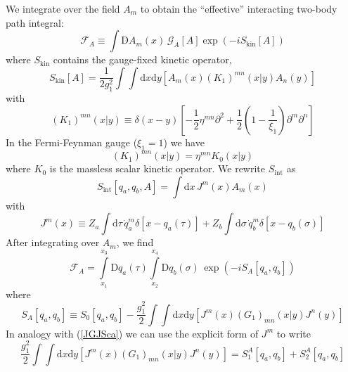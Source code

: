 We integrate over the field $A_{m}$ to obtain the ``effective'' interacting two-body path integral:
\begin{equation}
	\mathcal{F}_{A} \equiv \int \mathrm{D}A_{m}(x) \, \mathcal{G}_{A}[A] \exp{\left( -i S_{\text{kin}}[A] \right)}
\end{equation}
where $S_{\text{kin}}$ contains the gauge-fixed kinetic operator,
\begin{equation}
	S_{\text{kin}}[A] = \frac{1}{2g_{1}^{2}} \int \int \mathrm{d}x \mathrm{d}y \left[ A_{m}(x) (K_{1})^{mn}(x|y) A_{n}(y) \right] \label{SkinVec}
\end{equation}
with
\begin{equation}
	(K_{1})^{mn}(x|y) \equiv \delta(x - y) \left[-\frac{1}{2}\eta^{mn}\partial^{2} + \frac{1}{2} \left(1 - \frac{1}{\xi_{1}} \right) \partial^{m} \partial^{n} \right]
\end{equation}
In the Fermi-Feynman gauge ($\xi_{1} = 1$) we have
\begin{equation}
	(K_{1})^{mn}(x|y) = \eta^{mn} K_{0}(x|y)
\end{equation}
where $K_{0}$ is the massless scalar kinetic operator. We rewrite $S_{\text{int}}$ as
\begin{equation}
	S_{\text{int}}[q_{a}, q_{b}, A] = \int \mathrm{d}x \, J^{m}(x) A_{m}(x)
\end{equation}
with
\begin{equation}
	J^{m}(x) \equiv Z_{a} \int \mathrm{d}\tau \, \dot{q}_{a}^{m} \delta[x - q_{a}(\tau)] + Z_{b} \int \mathrm{d}\sigma \, \dot{q}_{b}^{m} \delta[x - q_{b}(\sigma)]
\end{equation}
After integrating over $A_{m}$, we find
\begin{equation}
	\mathcal{F}_{A} = \int\limits_{x_{1}}^{x_{3}} \mathrm{D}q_{a}(\tau) \int\limits_{x_{2}}^{x_{4}} \mathrm{D}q_{b}(\sigma) \, \exp{\left(- i S_{A}[q_{a}, q_{b}] \right)}
\end{equation}
where
\begin{equation}
	S_{A}[q_{a}, q_{b}] \equiv S_{0}[q_{a}, q_{b}] - \frac{g_{1}^{2}}{2} \int \int \mathrm{d} x \mathrm{d} y \left[ J^{m}(x) (G_{1})_{mn}(x|y) J^{n}(y) \right]
\end{equation}
In analogy with (\ref{JGJSca}) we can use the explicit form of $J^{m}$ to write
\begin{equation}
	\frac{g_{1}^{2}}{2} \int \int \mathrm{d} x \mathrm{d} y \left[ J^{m}(x) (G_{1})_{mn}(x|y) J^{n}(y) \right] = S_{1}^{A}[q_{a}, q_{b}] + S_{2}^{A}[q_{a}, q_{b}]
\end{equation}
